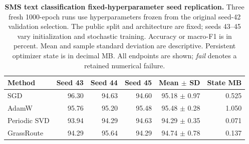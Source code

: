 \begin{table}[t]\centering\footnotesize
\caption{\textbf{SMS text classification fixed-hyperparameter seed replication.} Three fresh 1000-epoch runs use
hyperparameters frozen from the original seed-42 validation selection.
The public split and architecture are fixed; seeds 43--45 vary
initialization and stochastic training. Accuracy or macro-F1 is in
percent. Mean and sample standard deviation are descriptive.
Persistent optimizer state is in decimal MB. All endpoints are shown;
\emph{fail} denotes a retained numerical failure.}
\label{tab:focused-sms-replication}
\setlength{\tabcolsep}{7pt}
\begin{tabular}{lrrrrr}\toprule
Method & Seed 43 & Seed 44 & Seed 45 & Mean $\pm$ SD & State MB \\ \midrule
SGD & 96.30 & 94.63 & 94.60 & 95.18 $\pm$ 0.97 & 0.525 \\
AdamW & 95.76 & 95.20 & 95.48 & 95.48 $\pm$ 0.28 & 1.050 \\
Periodic SVD & 93.94 & 94.29 & 94.63 & 94.29 $\pm$ 0.35 & 0.071 \\
GrassRoute & \cellcolor{oursbg}94.29 & \cellcolor{oursbg}95.64 & \cellcolor{oursbg}94.29 & \cellcolor{oursbg}94.74 $\pm$ 0.78 & 0.137 \\
\bottomrule\end{tabular}\end{table}
